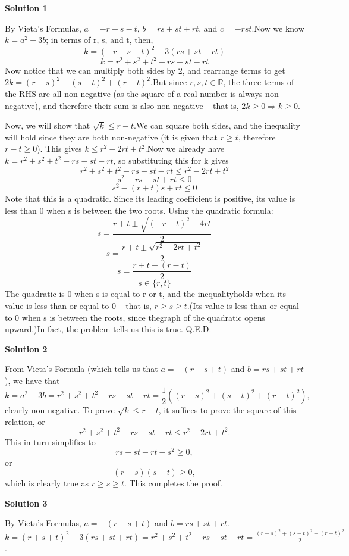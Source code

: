 \begin{enumerate}
 



\textbf{Solution 1}

By Vieta's Formulas, $a=-r-s-t$, $b=rs+st+rt$, and $c=-rst$.Now we know $k=a^2-3b$; in terms of r, s, and t, then, 
 \[k=(-r-s-t)^2-3(rs+st+rt)\]
 \[k=r^2+s^2+t^2-rs-st-rt\]Now notice that we can multiply both sides by 2, and rearrange terms to get$2k=(r-s)^2+(s-t)^2+(r-t)^2$.But since $r, s, t\in \mathbb{R}$, the three terms of the RHS are all non-negative (as the square of a real number is always non-negative), and therefore their sum is also non-negative -- that is, $2k\ge 0 \Rightarrow k\ge 0$.

 Now, we will show that $\sqrt k\le r-t$.We can square both sides, and the inequality will hold since they are both non-negative (it is given that $r\ge t$, therefore $r-t\ge 0$). This gives $k \le r^2-2rt+t^2$.Now we already have $k=r^2+s^2+t^2-rs-st-rt$, so substituting this for k gives
 \[r^2+s^2+t^2-rs-st-rt \le r^2-2rt+t^2\]
 \[s^2-rs-st+rt \le 0\]
 \[s^2-(r+t)s+rt \le 0\]Note that this is a quadratic. Since its leading coefficient is positive, its value is less than 0 when s is between the two roots. Using the quadratic formula:
 \[s=\frac {r+t\pm \sqrt {(-r-t)^2-4rt} } 2\]
 \[s=\frac {r+t\pm \sqrt {r^2-2rt+t^2} } 2\]
 \[s=\frac {r+t\pm (r-t) } 2\]
 \[s \in \{r, t\}\]The quadratic is 0 when s is equal to r or t, and the inequalityholds when its value is less than or equal to 0 -- that is, $r\ge s\ge t$.(Its value is less than or equal to 0 when s is between the roots, since thegraph of the quadratic opens upward.)In fact, the problem tells us this is true. Q.E.D.

 



\textbf{Solution 2}

From Vieta's Formula (which tells us that $a = -(r+s+t)$ and $b = rs + st + rt$), we have that
 \[k = a^2 - 3b = r^2 + s^2 + t^2 - rs - st - rt = \frac{1}{2} ((r-s)^2 + (s-t)^2 + (r-t)^2),\]clearly non-negative. To prove $\sqrt{k} \le r - t$, it suffices to prove the square of this relation, or 
 \[r^2 + s^2 + t^2 - rs - st - rt \le r^2 - 2rt + t^2.\] This in turn simplifies to 
 \[rs + st - rt - s^2 \ge 0,\] or 
 \[(r - s)(s - t) \ge 0,\] which is clearly true as $r \ge s \ge t$. This completes the proof.

 



\textbf{Solution 3}

By Vieta's Formulas, $a = -(r+s+t)$ and $b = rs + st + rt$. $k = (r+s+t)^2 - 3(rs + st + rt) = r^2+s^2+t^2-rs-st-rt = \frac{(r-s)^2 + (s-t)^2 + (r-t)^2}{2}$.


\end{enumerate}
